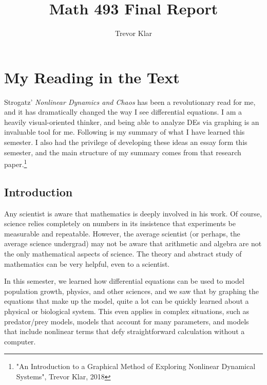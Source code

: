 \documentclass[a5paper]{article}
\title{Math 493 Final Report}
\author{Trevor Klar}
\theoremstyle{definition}%
\numberwithin{exercise}{section}
\theoremstyle{remark}%
\begin{document}
\maketitle
\tableofcontents

\pagebreak
\section{My Reading in the Text}

Strogatz' \emph{Nonlinear Dynamics and Chaos} has been a revolutionary read for me, and it has dramatically changed the way I see differential equations. I am a heavily visual-oriented thinker, and being able to analyze DEs via graphing is an invaluable tool for me. Following is my summary of what I have learned this semester. I also had the privilege of developing these ideas an essay form this semester, and the main structure of my summary comes from that research paper.\footnote{"An Introduction to a Graphical Method of Exploring Nonlinear Dynamical Systems", Trevor Klar, 2018}

\subsection{Introduction}
Any scientist is aware that mathematics is deeply involved in his work. Of course, science relies completely on numbers in its insistence that experiments be measurable and repeatable. However, the average scientist (or perhaps, the average science undergrad) may not be aware that arithmetic and algebra are not the only mathematical aspects of science. The theory and abstract study of mathematics can be very helpful, even to a scientist. 

In this semester, we learned how differential equations can be used to model population growth, physics, and other sciences, and we saw that by graphing the equations that make up the model, quite a lot can be quickly learned about a physical or biological system. This even applies in complex situations, such as predator/prey models, models that account for many parameters, and models that include nonlinear terms that defy straightforward calculation without a computer. 
\end{document}
